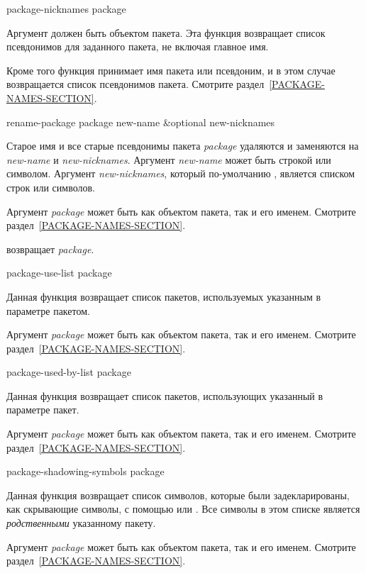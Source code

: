 \begin{defun}[Функция]
package-nicknames package

Аргумент должен быть объектом пакета. Эта функция возвращает список псевдонимов
для заданного пакета, не включая главное имя.

Кроме того функция принимает имя пакета или псевдоним, и в этом случае
возвращается список псевдонимов пакета. Смотрите раздел~\ref{PACKAGE-NAMES-SECTION}.
\end{defun}

\begin{defun}[Функция]
rename-package package new-name &optional new-nicknames

Старое имя и все старые псевдонимы пакета \emph{package} удаляются и заменяются
на \emph{new-name} и \emph{new-nicknames}. Аргумент \emph{new-name} может быть
строкой или символом. Аргумент \emph{new-nicknames}, который по-умолчанию
{\false}, является списком строк или символов.

Аргумент \emph{package} может быть как объектом пакета, так и его
именем. Смотрите раздел~\ref{PACKAGE-NAMES-SECTION}.

 возвращает \emph{package}.
\end{defun}

\begin{defun}[Функция]
package-use-list package

Данная функция возвращает список пакетов, используемых указанным в параметре
пакетом.

Аргумент \emph{package} может быть как объектом пакета, так и его
именем. Смотрите раздел~\ref{PACKAGE-NAMES-SECTION}.
\end{defun}

\begin{defun}[Функция]
package-used-by-list package

Данная функция возвращает список пакетов, использующих указанный в параметре
пакет.

Аргумент \emph{package} может быть как объектом пакета, так и его
именем. Смотрите раздел~\ref{PACKAGE-NAMES-SECTION}.
\end{defun}

\begin{defun}[Функция]
package-shadowing-symbols package

Данная функция возвращает список символов, которые были задекларированы, как
скрывающие символы, с помощью  или . Все
символы в этом списке является \emph{родственными} указанному пакету.

Аргумент \emph{package} может быть как объектом пакета, так и его
именем. Смотрите раздел~\ref{PACKAGE-NAMES-SECTION}.
\end{defun}

